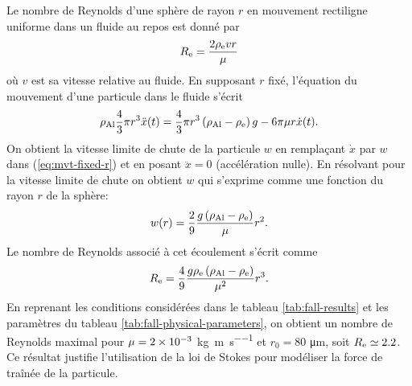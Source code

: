\begin{remarque}
  Le nombre de Reynolds d'une sphère de rayon $r$ en mouvement
  rectiligne uniforme dans un fluide au repos est donné par
  \begin{equation*}
    R_{\mathrm e} = \frac{2 \rho_\mathrm{e} v r}{\mu}
  \end{equation*}
  où $v$ est sa vitesse relative au fluide.  En supposant $r$ fixé,
  l'équation du mouvement d'une particule dans le fluide s'écrit
  \begin{equation}\label{eq:mvt-fixed-r}
    \rho_\mathrm{Al} \frac{4}{3}\pi r^3 \ddot x(t) = \frac{4}{3}\pi
    r^3\left( \rho_\mathrm{Al} - \rho_\mathrm{e} \right)g -
  6\pi\mu r\dot x(t).
  \end{equation}
  On obtient la vitesse limite de chute de la particule $w$ en
  remplaçant $\dot x$ par $w$ dans (\ref{eq:mvt-fixed-r}) et en posant $\ddot x
  = 0$ (accélération nulle). En résolvant pour la vitesse limite de
  chute on obtient $w$ qui s'exprime comme une fonction du rayon $r$ de la sphère:
  \begin{equation}\label{eq:terminal-velocity}
    w(r) = \frac{2}{9}\frac{g\left( \rho_\mathrm{Al} - \rho_\mathrm{e} \right)}{\mu}r^2.
  \end{equation}
  Le nombre de Reynolds associé à cet écoulement s'écrit comme
  \begin{equation*}
    R_{\mathrm e} =
    \frac{4}{9}\frac{g\rho_\mathrm{e}\left( \rho_\mathrm{Al} - \rho_\mathrm{e} \right)}{\mu^2}r^3.
  \end{equation*}
  En reprenant les conditions considérées dans le tableau
  \ref{tab:fall-results} et les paramètres du tableau
  \ref{tab:fall-physical-parameters}, on obtient un nombre de Reynolds
  maximal pour $\mu = \num{2e-3}$
  \si{\kilo\gram\per\meter\per\second} et $r_0 = 80$
  \si{\micro\meter}, soit $R_{\mathrm e} \simeq 2.2$. Ce résultat justifie
  l'utilisation de la loi de Stokes pour modéliser la force de traînée
  de la particule.
\end{remarque}

